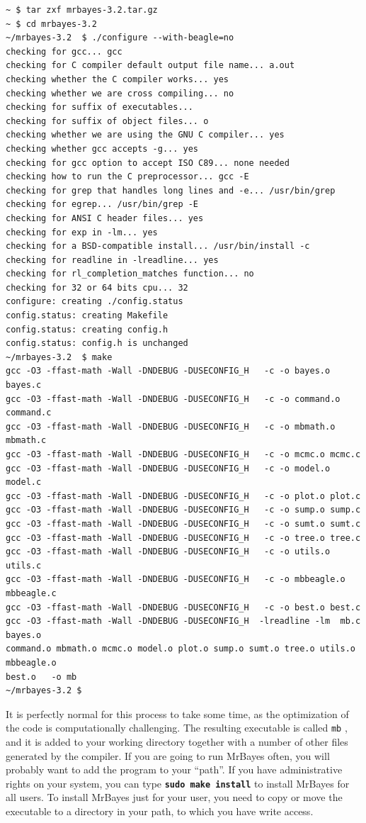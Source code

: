 \documentclass[12pt]{book}
\newcommand{\ttt}[1]{\texttt{#1} }
\newcommand{\tb}[1]{\texttt{\textbf{#1}} }
\begin{document}
\begin{singlespacing}
\small
\begin{verbatim}
~ $ tar zxf mrbayes-3.2.tar.gz
~ $ cd mrbayes-3.2
~/mrbayes-3.2  $ ./configure --with-beagle=no
checking for gcc... gcc
checking for C compiler default output file name... a.out
checking whether the C compiler works... yes
checking whether we are cross compiling... no
checking for suffix of executables... 
checking for suffix of object files... o
checking whether we are using the GNU C compiler... yes
checking whether gcc accepts -g... yes
checking for gcc option to accept ISO C89... none needed
checking how to run the C preprocessor... gcc -E
checking for grep that handles long lines and -e... /usr/bin/grep
checking for egrep... /usr/bin/grep -E
checking for ANSI C header files... yes
checking for exp in -lm... yes
checking for a BSD-compatible install... /usr/bin/install -c
checking for readline in -lreadline... yes
checking for rl_completion_matches function... no
checking for 32 or 64 bits cpu... 32
configure: creating ./config.status
config.status: creating Makefile
config.status: creating config.h
config.status: config.h is unchanged
~/mrbayes-3.2  $ make
gcc -O3 -ffast-math -Wall -DNDEBUG -DUSECONFIG_H   -c -o bayes.o bayes.c
gcc -O3 -ffast-math -Wall -DNDEBUG -DUSECONFIG_H   -c -o command.o command.c
gcc -O3 -ffast-math -Wall -DNDEBUG -DUSECONFIG_H   -c -o mbmath.o mbmath.c
gcc -O3 -ffast-math -Wall -DNDEBUG -DUSECONFIG_H   -c -o mcmc.o mcmc.c
gcc -O3 -ffast-math -Wall -DNDEBUG -DUSECONFIG_H   -c -o model.o model.c
gcc -O3 -ffast-math -Wall -DNDEBUG -DUSECONFIG_H   -c -o plot.o plot.c
gcc -O3 -ffast-math -Wall -DNDEBUG -DUSECONFIG_H   -c -o sump.o sump.c
gcc -O3 -ffast-math -Wall -DNDEBUG -DUSECONFIG_H   -c -o sumt.o sumt.c
gcc -O3 -ffast-math -Wall -DNDEBUG -DUSECONFIG_H   -c -o tree.o tree.c
gcc -O3 -ffast-math -Wall -DNDEBUG -DUSECONFIG_H   -c -o utils.o utils.c
gcc -O3 -ffast-math -Wall -DNDEBUG -DUSECONFIG_H   -c -o mbbeagle.o mbbeagle.c
gcc -O3 -ffast-math -Wall -DNDEBUG -DUSECONFIG_H   -c -o best.o best.c
gcc -O3 -ffast-math -Wall -DNDEBUG -DUSECONFIG_H  -lreadline -lm  mb.c bayes.o
command.o mbmath.o mcmc.o model.o plot.o sump.o sumt.o tree.o utils.o mbbeagle.o
best.o   -o mb
~/mrbayes-3.2 $ 
\end{verbatim}
\normalsize
\end{singlespacing}

It is perfectly normal for this process to take some time, as the optimization of the code is
computationally challenging. The resulting executable is called \ttt{mb}, and it is added to your
working directory together with a number of other files generated by the compiler.  If you are
going to run MrBayes often, you will probably want to add the program to your ``path''.  If you
have administrative rights on your system, you can type \tb{sudo make install} to install MrBayes
for all users. To install MrBayes just for your user, you need to copy or move the executable to a
directory in your path, to which you have write access.
\end{document}

